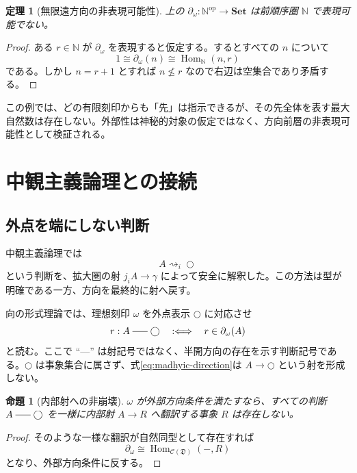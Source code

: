 \documentclass[a4paper,11pt]{ltjsarticle}
\theoremstyle{definition}
\theoremstyle{plain}
\newtheorem{theorem}[definition]{定理}
\newtheorem{proposition}[definition]{命題}
\newcommand{\Set}{\mathbf{Set}}
\newcommand{\Hom}{\operatorname{Hom}}
\newcommand{\dfix}{\bigcirc}
\newcommand{\dline}{\mathrel{\rule[0.55ex]{1.6em}{0.4pt}}}
\begin{document}
\begin{theorem}[無限遠方向の非表現可能性]
上の $\partial_\omega:\mathbb N^{\mathrm{op}}\to\Set$ は前順序圏 $\mathbb N$ で表現可能でない。
\end{theorem}

\begin{proof}
ある $r\in\mathbb N$ が $\partial_\omega$ を表現すると仮定する。するとすべての $n$ について
\[
 1\cong\partial_\omega(n)
 \cong\Hom_{\mathbb N}(n,r)
\]
である。しかし $n=r+1$ とすれば $n\nleq r$ なので右辺は空集合であり矛盾する。
\end{proof}

この例では、どの有限刻印からも「先」は指示できるが、その先全体を表す最大自然数は存在しない。外部性は神秘的対象の仮定ではなく、方向前層の非表現可能性として検証される。

\section{中観主義論理との接続}

\subsection{外点を端にしない判断}

中観主義論理では
\[
 A\rightsquigarrow_i\dfix
\]
という判断を、拡大圏の射 $j_iA\to\gamma$ によって安全に解釈した。この方法は型が明確である一方、方向を最終的に射へ戻す。

向の形式理論では、理想刻印 $\omega$ を外点表示 $\dfix$ に対応させ
\begin{equation}
 r:A\dline\dfix
 \quad:\Longleftrightarrow\quad
 r\in\partial_\omega(A)
 \label{eq:madhyic-direction}
\end{equation}
と読む。ここで ``---'' は射記号ではなく、半開方向の存在を示す判断記号である。$\dfix$ は事象集合に属さず、式\eqref{eq:madhyic-direction}は $A\to\dfix$ という射を形成しない。

\begin{proposition}[内部射への非崩壊]
$\omega$ が外部方向条件を満たすなら、すべての判断 $A\dline\dfix$ を一様に内部射 $A\to R$ へ翻訳する事象 $R$ は存在しない。
\end{proposition}

\begin{proof}
そのような一様な翻訳が自然同型として存在すれば
\[
 \partial_\omega\cong
 \Hom_{\mathcal C(\mathfrak D)}(-,R)
\]
となり、外部方向条件に反する。
\end{proof}
\end{document}

